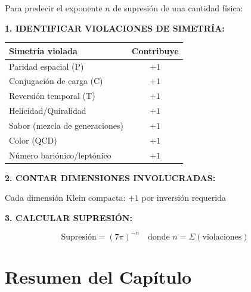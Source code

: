 Para predecir el exponente $n$ de supresión de una cantidad física:

\textbf{1. IDENTIFICAR VIOLACIONES DE SIMETRÍA:}

\begin{center}
\begin{tabular}{lc}
\toprule
\textbf{Simetría violada} & \textbf{Contribuye} \\
\midrule
Paridad espacial (P) & $+1$ \\
Conjugación de carga (C) & $+1$ \\
Reversión temporal (T) & $+1$ \\
Helicidad/Quiralidad & $+1$ \\
Sabor (mezcla de generaciones) & $+1$ \\
Color (QCD) & $+1$ \\
Número bariónico/leptónico & $+1$ \\
\bottomrule
\end{tabular}
\end{center}

\textbf{2. CONTAR DIMENSIONES INVOLUCRADAS:}

Cada dimensión Klein compacta: $+1$ por inversión requerida

\textbf{3. CALCULAR SUPRESIÓN:}

\begin{equation}
\text{Supresión} = (7\pi)^{-n} \quad \text{donde } n = \Sigma(\text{violaciones})
\end{equation}


\section{Resumen del Capítulo}

